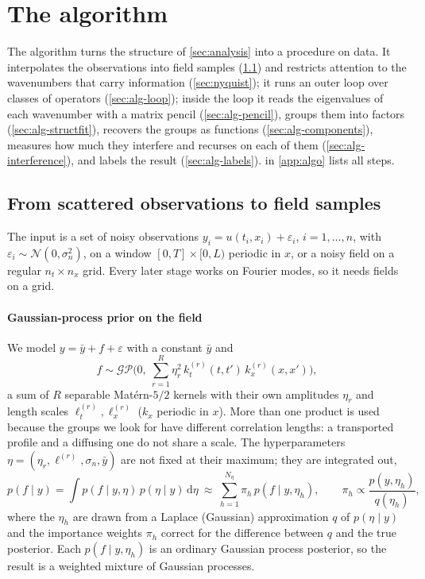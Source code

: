 \documentclass[11pt]{article}
\theoremstyle{plain}
\theoremstyle{definition}
\theoremstyle{remark}
\newcommand{\dd}{\,\mathrm{d}}
\newcommand{\noise}{\sigma_{n}}             %
\newcommand{\Normal}{\mathcal{N}}
\begin{document}
\section{The algorithm}\label{sec:algorithm}
The algorithm turns the structure of \cref{sec:analysis} into a procedure on data. It interpolates the observations
into field samples (\cref{sec:alg-interp}) and restricts attention to the wavenumbers that carry information
(\cref{sec:nyquist}); it runs an outer loop over classes of operators (\cref{sec:alg-loop}); inside the loop it reads
the eigenvalues of each wavenumber with a matrix pencil (\cref{sec:alg-pencil}), groups them into factors
(\cref{sec:alg-structfit}), recovers the groups as functions (\cref{sec:alg-components}), measures how much they
interfere and recurses on each of them (\cref{sec:alg-interference}), and labels the result (\cref{sec:alg-labels}).
 in \cref{app:algo} lists all steps.

\subsection{From scattered observations to field samples}\label{sec:alg-interp}
The input is a set of noisy observations $y_i=u(t_i,x_i)+\varepsilon_i$, $i=1,\dots,n$, with
$\varepsilon_i\sim\Normal(0,\noise^2)$, on a window $[0,T]\times[0,L)$ periodic in $x$, or a noisy field on a
regular $n_t\times n_x$ grid. Every later stage works on Fourier modes, so it needs fields on a grid.

\paragraph{Gaussian-process prior on the field}
We model $y=\bar y+f+\varepsilon$ with a constant $\bar y$ and
\begin{equation}\label{eq:gp}
  f\sim\mathcal{GP}\Big(0,\ \sum_{r=1}^{R}\eta_r^2\,k_t^{(r)}(t,t')\,k_x^{(r)}(x,x')\Big),
\end{equation}
a sum of $R$ separable Mat\'ern-$5/2$ kernels with their own amplitudes $\eta_r$ and length scales
$\ell_t^{(r)},\ell_x^{(r)}$ ($k_x$ periodic in $x$). More than one product is used because the groups we
look for have different correlation lengths: a transported profile and a diffusing one do not share a
scale. The hyperparameters $\eta=(\eta_r,\ell^{(r)},\noise,\bar y)$ are not fixed at their maximum; they are integrated out,
\begin{equation}\label{eq:marginal-eta}
  p(f\mid y)=\int p(f\mid y,\eta)\,p(\eta\mid y)\dd\eta\ \approx\ \sum_{h=1}^{N_\eta}\pi_h\,p(f\mid y,\eta_h),
  \qquad \pi_h\propto\frac{p(y,\eta_h)}{q(\eta_h)},
\end{equation}
where the $\eta_h$ are drawn from a Laplace (Gaussian) approximation $q$ of $p(\eta\mid y)$ and the importance weights
$\pi_h$ correct for the difference between $q$ and the true posterior. Each $p(f\mid y,\eta_h)$ is an ordinary Gaussian
process posterior, so the result is a weighted mixture of Gaussian processes.
\end{document}
